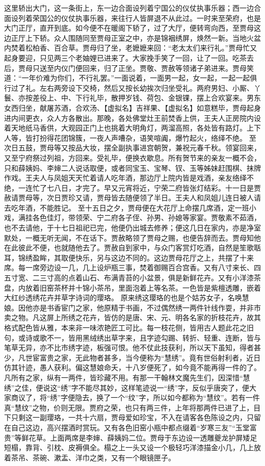 \documentclass[12pt,oneside]{book}
\begin{document}
这里轿出大门，这一条街上，东一边合面设列着宁国公的仪仗执事乐器；西一边合面设列着荣国公的仪仗执事乐器，来往行人皆屏退不从此过。一时来至荣府，也是大门正厅，直开到底。如今便不在暖阁下轿了，过了大厅，便转弯向西，至贾母这边正厅上下轿。众人围随同至贾母正室之中，亦是锦裀绣屏，焕然一新。当地火盆内焚着松柏香、百合草。贾母归了坐，老嬷嬷来回：“老太太们来行礼。”贾母忙又起身要迎，只见两三个老妯娌已进来了。大家挽手笑了一回，让了一回。吃茶去后，贾母只送至内仪门便回来，归了正坐。贾敬、贾赦等领诸子弟进来。贾母笑道：“一年价难为你们，不行礼罢。”一面说着，一面男一起，女一起，一起一起俱行过了礼。左右两旁设下交椅，然后又按长幼挨次归坐受礼。两府男妇、小厮、丫鬟、亦按差役上、中、下行礼毕，散押岁钱、荷包、金银锞，摆上合欢宴来。男东女西归坐，献屠苏酒，合欢汤、【虚拟名】吉祥果、【虚拟名】如意糕毕，贾母起身进内间更衣，众人方各散出。那晚，各处佛堂灶王前焚香上供，王夫人正房院内设着天地纸马香供，大观园正门上也挑着大明角灯，两溜高照，各处皆有路灯。上下人等，皆打扮得花团锦簇，一夜人声嘈杂，语笑喧阗，爆竹起火，络绎不绝。
至次日五鼓，贾母等又按品大妆，摆全副执事进宫朝贺，兼祝元春千秋。领宴回来，又至宁府祭过列祖，方回来。受礼毕，便换衣歇息。所有贺节来的亲友一概不会，只和薛姨妈、李婶二人说话取便，或者同宝玉、宝琴、钗、玉等姊妹赶围棋、抹牌作戏。王夫人与凤姐天天忙着请人吃年酒，那边厅上院内皆是戏酒，亲友络绎不绝，一连忙了七八日，才完了。早又元宵将近，宁荣二府皆张灯结彩。十一日是贾赦请贾母等，次日贾珍又请，贾母皆去随便领了半日。王夫人和凤姐儿连日被人请去吃年酒，不能胜记。
至十五日之夕，贾母便在大花厅上命摆几席酒，定一班小戏，满挂各色佳灯，带领荣、宁二府各子侄、孙男、孙媳等家宴。贾敬素不茹酒，也不去请他，于十七日祖祀已完，他便仍出城去修养；便这几日在家内，亦是净室默处，一概无听无闻，不在话下。贾赦略领了贾母之赐，也便告辞而去。贾母知他在此彼此不便，也就随他去了。贾赦自到家中，与众门客赏灯吃酒，自然是笙歌聒耳，锦绣盈眸，其取便快乐，另与这边不同的。这边贾母花厅之上，共摆了十来席。每一席旁边设一几，几上设炉瓶三事，焚着御赐百合宫香。又有八寸来长、四五寸宽、二三寸高的点着山石、布满青苔的小盆景，俱是新鲜花卉。又有小洋漆茶盘，内放着旧窑茶杯并十锦小茶吊，里面泡着上等名茶。一色皆是紫檀透雕，嵌着大红纱透绣花卉并草字诗词的璎珞。
原来绣这璎珞的也是个姑苏女子，名唤慧娘。因他亦是书香宦门之家，他原精于书画，不过偶然绣一两件针线作耍，并非市卖之物。凡这屏上所绣之花卉，皆仿的是唐、宋、元、明各名家的折枝花卉，故其格式配色皆从雅，本来非一味浓艳匠工可比。每一枝花侧，皆用古人题此花之旧句，或诗或歌不一，皆用黑绒绣出草字来，且字迹勾踢、转折、轻重、连断，皆与笔草无异，亦不比市绣字迹，板强可恨。他不仗此技获利，所以天下虽知，得者甚少，凡世宦富贵之家，无此物者甚多，当今便称为“慧绣”。竟有世俗射利者，近日仿其针迹，愚人获利。偏这慧娘命夭，十八岁便死了，如今竟不能再得一件的了。凡所有之家，纵有一两件，皆珍藏不用。有那一干翰林文魔先生们，因深惜“慧绣”之佳，便说这“绣”字不能尽其妙，这样笔迹说一“绣”字，反似乎唐突了，便大家商议了，将“绣”字便隐去，换了一个“纹”字，所以如今都称为“慧纹”。若有一件真“慧纹”之物，价则无限。贾府之荣，也只有两三件，上年将那两件已进了上，目下只剩这一副璎珞，一共十六扇，贾母爱如珍宝，不入在请客各色陈设之内，只留在自己这边，高兴摆酒时赏玩。又有各色旧窑小瓶中都点缀着“岁寒三友”“玉堂富贵”等鲜花草。上面两席是李婶、薛姨妈二位。贾母于东边设一透雕夔龙护屏矮足短榻，靠背、引枕、皮褥俱全。榻之上一头又设一个极轻巧洋漆描金小几，几上放着茶吊、茶碗、漱盂、洋巾之类，又有一个眼镜匣子。
\end{document}

